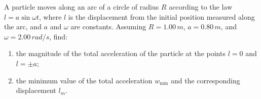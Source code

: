 
\item A particle moves along an arc of a circle of radius \( R \) according to the law \( l = a \sin \omega t \), where \( l \) is the displacement from the initial position measured along the arc, and \( a \) and \( \omega \) are constants. Assuming \( R = 1.00 \, m \), \( a = 0.80 \, m \), and \( \omega = 2.00 \, rad/s \), find:
    \begin{enumerate}
        \item the magnitude of the total acceleration of the particle at the points \( l = 0 \) and \( l = \pm a \);
        \item the minimum value of the total acceleration \( w_{\text{min}} \) and the corresponding displacement \( l_m \).
    \end{enumerate}



